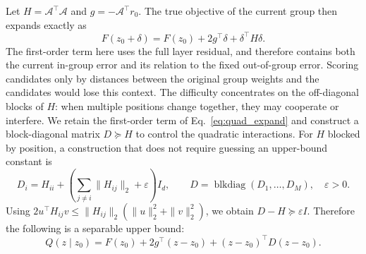 Let $H=\mathcal A^\top\mathcal A$ and $g=-\mathcal A^\top r_0$. The true objective of the current group then expands exactly as
\begin{equation}
F(z_0+\delta)=F(z_0)+2g^\top\delta+\delta^\top H\delta.
\label{eq:quad_expand}
\end{equation}
The first-order term here uses the full layer residual, and therefore contains both the current in-group error and its relation to the fixed out-of-group error.
Scoring candidates only by distances between the original group weights and the candidates would lose this context.
The difficulty concentrates on the off-diagonal blocks of $H$: when multiple positions change together, they may cooperate or interfere.
We retain the first-order term of Eq.~\eqref{eq:quad_expand} and construct a block-diagonal matrix $D\succeq H$ to control the quadratic interactions.
For $H$ blocked by position, a construction that does not require guessing an upper-bound constant is
\begin{equation}
D_i=H_{ii}+\left(\sum_{j\ne i}\|H_{ij}\|_2+\varepsilon\right)I_d,
\qquad D=\operatorname{blkdiag}(D_1,\ldots,D_M),\quad \varepsilon>0.
\label{eq:D}
\end{equation}
Using $2u^\top H_{ij}v\le\|H_{ij}\|_2(\|u\|_2^2+\|v\|_2^2)$, we obtain $D-H\succeq\varepsilon I$.
Therefore the following is a separable upper bound:
\begin{equation}
Q(z\mid z_0)=F(z_0)+2g^\top(z-z_0)+(z-z_0)^\top D(z-z_0).
\label{eq:Q}
\end{equation}


